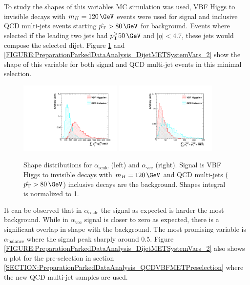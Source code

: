 To study the shapes of this variables \gls{MC} simulation was used, \gls{VBF} Higgs to invisible decays with $m_H=120\,\GeV$ events were used for signal and inclusive \gls{QCD} multi-jets events starting $\hat{\pt}>80\,\GeV$ for background. Events where selected if the leading two jets had $\pt^>50\,\GeV$ and $|\eta|<4.7$, these jets would compose the selected dijet. Figure \ref{FIGURE:PreparationParkedDataAnalysis_DijetMETSystemVars_1} and \ref{FIGURE:PreparationParkedDataAnalysis_DijetMETSystemVars_2} show the shape of this variable for both signal and \gls{QCD} multi-jet events in this minimal selection.

\begin{figure}[!htb]
\centering
\includegraphics[width=0.45\textwidth]{Chapter06/TopologicalVariables/Images/JetPair_scalSumTriObjectPt.pdf} 
\includegraphics[width=0.45\textwidth]{Chapter06/TopologicalVariables/Images/JetPair_vecSumTriObjectPt.pdf} 
\caption{Shape distributions for $\alpha_{\text{scale}}$ (left) and $\alpha_{\text{vec}}$ (right). Signal is \gls{VBF} Higgs to invisible decays with $m_H=120\,\GeV$ and \gls{QCD} multi-jets ($\hat{\pt}>80\,\GeV$) inclusive decays are the background. Shapes integral is normalized to 1.}
\label{FIGURE:PreparationParkedDataAnalysis_DijetMETSystemVars_1}
\end{figure}

It can be observed that in $\alpha_{\text{scale}}$ the signal as expected is harder the most background. While in $\alpha_{\text{vec}}$ signal is closer to zero as expected, there is a significant overlap in shape with the background. The most promising variable is $\alpha_{\text{balance}}$ where the signal peak sharply around 0.5. Figure \ref{FIGURE:PreparationParkedDataAnalysis_DijetMETSystemVars_2} also shows a plot for the pre-selection in section \ref{SECTION:PreparationParkedDataAnalysis_QCDVBFMETPreselection} where the new \gls{QCD} multi-jet samples are used. 


